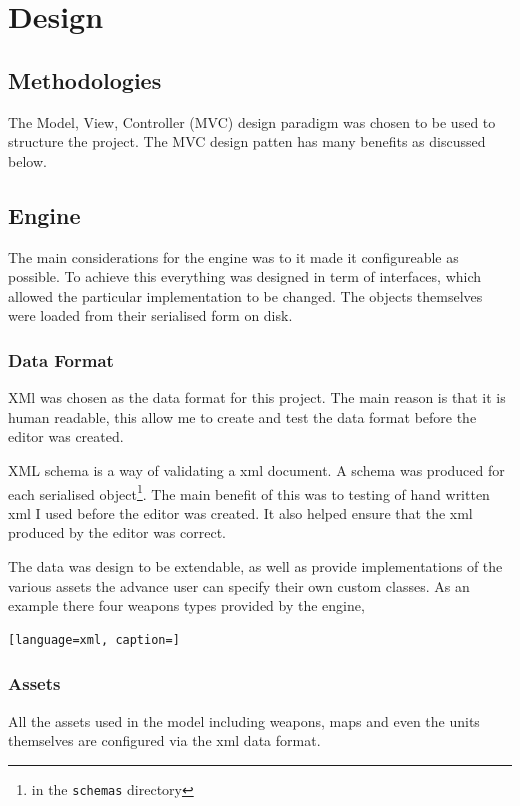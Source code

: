 \section{Design}

\subsection{Methodologies}
\label{sub:methodologies}
The Model, View, Controller (MVC) design paradigm was chosen to be used to structure the project. The MVC design patten has many benefits as discussed below.  


\subsection{Engine}
The main considerations  for the engine was to it made it configureable as possible. To achieve this everything was designed in term of interfaces, which allowed the particular implementation to be changed. The objects themselves were loaded from their serialised form on disk. 

\subsubsection{Data Format}
XMl was chosen as the data format for this project. The main reason is that it is human readable, this allow me to create and test the data format before the editor was created.

XML schema is a way of validating a  xml document. A schema was produced for each serialised object\footnote{in the \texttt{schemas} directory}. 
The main benefit of this was to testing of hand written xml I used before the editor was created. It also helped ensure that the xml produced by the editor was correct.  

The data was design to be extendable, as well as provide implementations of the various assets the advance user can specify their own custom classes. As an example there four weapons types provided by the engine,

\begin{lstlisting}[language=xml, caption=]

\end{lstlisting}


\subsubsection{Assets}
All the assets used in the model including weapons, maps and even the units themselves are configured via the xml data format.  


